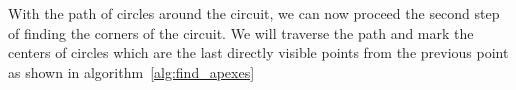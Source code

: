With the path of circles around the circuit, we can now proceed the second step of finding the corners of the circuit. We will traverse the path and mark the centers of circles which are the last directly visible points from the previous point as shown in algorithm~\ref{alg:find_apexes}


%
%
%




